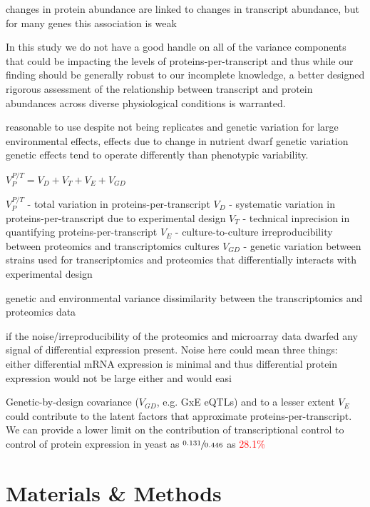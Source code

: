  changes in protein abundance are linked to changes in transcript abundance, but for many genes this association is weak

In this study we do not have a good handle on all of the variance components that could be impacting the levels of proteins-per-transcript and thus while our finding should be generally robust to our incomplete knowledge, a better designed rigorous assessment of the relationship between transcript and protein abundances across diverse physiological conditions is warranted.



\begin{outline}
\1 reasonable to use despite not being replicates and genetic variation
\2 for large environmental effects, effects due to change in nutrient dwarf genetic variation
\2 genetic effects tend to operate differently than phenotypic variability.
\end{outline}

$V^{P/T}_{P} = V_{D} + V_{T} + V_{E} + V_{GD}$
\begin{outline}
\1 $V^{P/T}_{P}$ - total variation in proteins-per-transcript
\1 $V_{D}$ - systematic variation in proteins-per-transcript due to experimental design
\1 $V_{T}$ - technical inprecision in quantifying proteins-per-transcript
\1 $V_{E}$ - culture-to-culture irreproducibility between proteomics and transcriptomics cultures
\1 $V_{GD}$ - genetic variation between strains used for transcriptomics and proteomics that differentially interacts with experimental design
\end{outline}
genetic and environmental variance 
dissimilarity between the transcriptomics and proteomics data

if the noise/irreproducibility of the proteomics and microarray data dwarfed any signal of differential expression present. Noise here could mean three things: either differential mRNA expression is minimal and thus differential protein expression would not be large either and would easi 

Genetic-by-design covariance ($V_{GD}$, e.g. GxE eQTLs) and to a lesser extent $V_{E}$ could contribute to the latent factors that approximate proteins-per-transcript.  We can provide a lower limit on the contribution of transcriptional control to control of protein expression in yeast as $\sfrac{0.131}{0.446}$ as \textcolor{red}{28.1\%}


\section*{Materials \& Methods}

